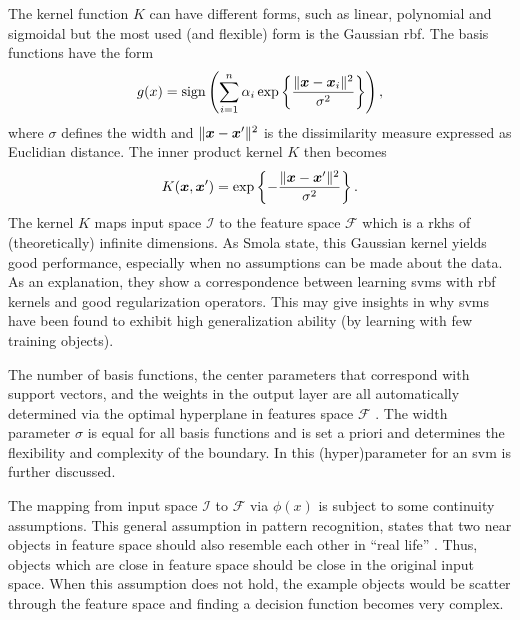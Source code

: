 The kernel function $K$ can have different forms, such as linear, polynomial and sigmoidal but the most used (and flexible) form is the Gaussian \gls{rbf}.
The basis functions have the form
\begin{equation}
  g(x) = \operatorname*{sign} \left(  \sum_{i=1}^{n} \alpha_i \operatorname*{exp} \left\{ \frac{\rVert \vectorsym{x} - \vectorsym{x}_i \rVert ^2}{\sigma^2} \right\} \right),
\end{equation}
where $\sigma$ defines the width and $\rVert \vectorsym{x} - \vectorsym{x}' \rVert ^2$ is the dissimilarity measure expressed as Euclidian distance.
The inner product kernel $K$ then becomes
\begin{equation}
  K(\vectorsym{x}, \vectorsym{x}') = \operatorname*{exp} \left\{ - \frac{ \rVert \vectorsym{x} - \vectorsym{x}' \rVert ^2}{\sigma^2} \right\}.
\end{equation}
The kernel $K$ maps input space $\mathcal{I}$ to the feature space $\mathcal{F}$ which is a \gls{rkhs} of (theoretically) infinite dimensions.
As Smola \etal \cite{smola1998connection} state, this Gaussian kernel yields good performance, especially when no assumptions can be made about the data.
As an explanation, they show a correspondence between learning \glspl{svm} with \gls{rbf} kernels and good regularization operators.
This may give insights in why \glspl{svm} have been found to exhibit high generalization ability (by learning with few training objects).

The number of basis functions, the center parameters that correspond with support vectors, and the weights in the output layer are all automatically determined via the optimal hyperplane in features space $\mathcal{F}$ \cite{cherkassky2007learning}.
The width parameter $\sigma$ is equal for all basis functions and is set a priori and determines the flexibility and complexity of the boundary.
In  this (hyper)parameter for an \gls{svm} is further discussed.

The mapping from input space $\mathcal{I}$ to $\mathcal{F}$ via $\phi(x)$ is subject to some continuity assumptions.
This general assumption in pattern recognition, states that two near objects in feature space should also resemble each other in ``real life'' \cite{tax2001one}.
Thus, objects which are close in feature space should be close in the original input space.
When this assumption does not hold, the example objects would be scatter through the feature space and finding a decision function becomes very complex.

